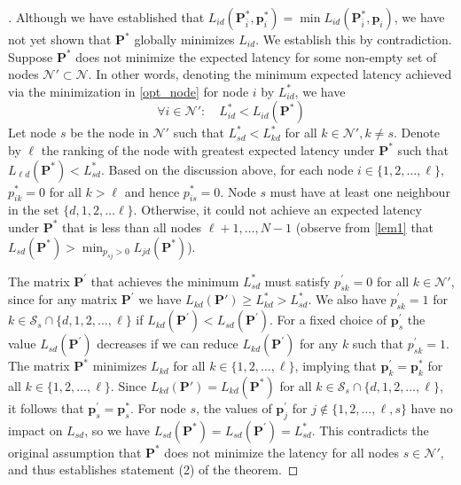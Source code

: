 \documentclass[journal,onecolumn,11pt]{IEEEtran}
\theoremstyle{plain}
\theoremstyle{definition}
\def\bp{{\mathbf p}}
\def\bP{{\mathbf P}}
\def\cS{{\mathcal S}}
\def\cN{{\mathcal N}}
\begin{document}
\begin{proof}[\unskip\nopunct]
Although we have established that $L_{id}(\bP^*_{\bar i},\bp^*_i) = \min
L_{id}(\bP^*_{\bar i}, \bp_i)$, we have not yet shown that $\bP^*$
globally minimizes $L_{id}$. We establish this by
contradiction. Suppose $\mathbf{P}^*$ does not minimize the expected
latency for some non-empty set of nodes $\mathcal{N'} \subset
\mathcal{N}$. In other words, denoting the minimum expected latency
achieved via the minimization in \eqref{opt_node} for node $i$ by
$L_{id}^*$, we have
\begin{equation}
\forall i \in \mathcal{N}': \quad L_{id}^* < L_{id}(\mathbf{P}^*)
\end{equation}
Let node $s$ be the node in $\cN'$ such
that $L_{sd}^*<L_{kd}^*$ for all $k \in \cN', k \neq s$. Denote by
$\ell$ the ranking of the node with greatest expected latency under
$\bP^*$ such that $L_{\ell d}(\bP^*) < L_{sd}^*$. Based on the
discussion above, for each node $i \in \{1, 2,\dots,\ell\}$,
$p^*_{ik}=0$ for all $k>\ell$ and hence
$p^*_{is}=0$. Node $s$ must have at least one neighbour in the set $\{d,1,
2,\dots\ell\}$. Otherwise, it could not achieve an expected latency
under $\bP^*$ that is less than all nodes $\ell+1,\dots,N-1$ (observe from
 \eqref{lem1} that $L_{sd}(\bP^*) > \min_{p_{sj}>0} L_{jd}(\bP^*)$). 

 The matrix $\bP^\prime$ that achieves the minimum $L_{sd}^*$ must
 satisfy $p^\prime_{sk}=0$ for all $k\in \mathcal{N}'$, since for any
 matrix $\bP^\prime$ we have $L_{kd}(\bP') \geq L_{kd}^* >
 L_{sd}^*$. We also have $p^\prime_{sk} = 1$ for $k\in \cS_s\cap
 \{d,1,2,\dots,\ell\}$ if
 $L_{kd}(\bP^\prime)<L_{sd}(\bP^\prime)$. For a fixed choice of
 $\bp^\prime_s$ the value $L_{sd}(\bP^\prime)$ decreases if we can
 reduce $L_{kd}(\bP^\prime)$ for any $k$ such that $p^\prime_{sk} =
 1$. The matrix $\bP^*$ minimizes $L_{kd}$ for all $k\in
 \{1,2,\dots,\ell\}$, implying that $\bp^\prime_k = \bp^*_k$
 for all $k \in \{1,2,\dots,\ell\}$. Since $L_{kd}(\bP') =
 L_{kd}(\bP^*)$ for all $k \in \cS_s\cap \{d,1, 2,\dots,\ell\}$, it
 follows that $\bp^\prime_s = \bp^*_s$. For node $s$, the values
 of $\bp^{\prime}_j$ for $j \notin \{1,2,\dots,\ell, s\}$ have no
 impact on $L_{sd}$, so we have $L_{sd}(\bP^*) = L_{sd}(\bP^\prime) =
 L_{sd}^*$. This contradicts the original assumption that $\bP^*$ does
 not minimize the latency for all nodes $s \in \cN'$, and thus
 establishes statement (2) of the theorem.
\end{proof}
\end{document}
